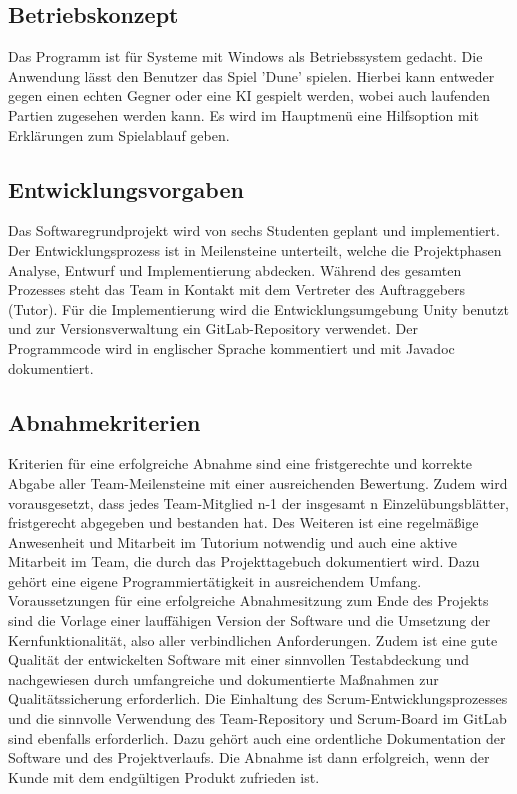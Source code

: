\documentclass[12pt]{article}
\newcounter{fa}
\newcounter{nfa}
\begin{document}
\newpage

\flushleft

\subsection{Betriebskonzept}

Das Programm ist für Systeme mit Windows als Betriebssystem gedacht. Die Anwendung lässt den Benutzer das Spiel 'Dune' spielen. Hierbei kann entweder gegen einen echten Gegner oder eine KI gespielt werden, wobei auch laufenden Partien zugesehen werden kann. Es wird im Hauptmenü eine Hilfsoption mit Erklärungen zum Spielablauf geben.

\subsection{Entwicklungsvorgaben}

Das Softwaregrundprojekt wird von sechs Studenten geplant und implementiert. Der Entwicklungsprozess ist in Meilensteine unterteilt, welche die Projektphasen Analyse, Entwurf und Implementierung abdecken. Während des gesamten Prozesses steht das Team in Kontakt mit dem Vertreter des Auftraggebers (Tutor). Für die Implementierung wird die Entwicklungsumgebung Unity benutzt und zur Versionsverwaltung ein GitLab-Repository verwendet. Der Programmcode wird in englischer Sprache kommentiert und mit Javadoc dokumentiert. 

\subsection{Abnahmekriterien}

Kriterien für eine erfolgreiche Abnahme sind eine fristgerechte und korrekte Abgabe aller Team-Meilensteine mit einer ausreichenden Bewertung. Zudem wird vorausgesetzt, dass jedes Team-Mitglied n-1 der insgesamt n Einzelübungsblätter, fristgerecht abgegeben und bestanden hat.
Des Weiteren ist eine regelmäßige Anwesenheit und Mitarbeit im Tutorium notwendig und auch eine aktive Mitarbeit im Team, die durch das Projekttagebuch dokumentiert wird. Dazu gehört eine eigene Programmiertätigkeit in ausreichendem Umfang.
Voraussetzungen für eine erfolgreiche Abnahmesitzung zum Ende des Projekts sind die Vorlage einer lauffähigen Version der Software und die Umsetzung der Kernfunktionalität, also aller verbindlichen Anforderungen. Zudem ist eine gute Qualität der entwickelten Software mit einer sinnvollen Testabdeckung und nachgewiesen durch umfangreiche und dokumentierte Maßnahmen zur Qualitätssicherung erforderlich. Die Einhaltung des Scrum-Entwicklungsprozesses und die sinnvolle Verwendung des Team-Repository und Scrum-Board im GitLab sind ebenfalls erforderlich. Dazu gehört auch eine ordentliche Dokumentation der Software und des Projektverlaufs.
Die Abnahme ist dann erfolgreich, wenn der Kunde mit dem endgültigen Produkt zufrieden ist.
\end{document}
